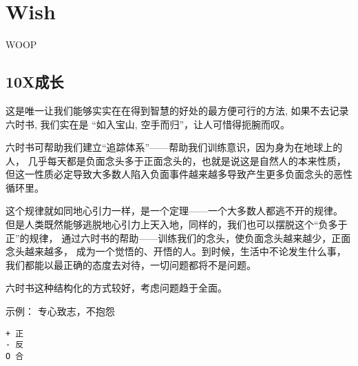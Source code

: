 \chapter{Wish}

WOOP

\section{10X成长}

\begin{tcolorbox}
这是唯一让我们能够实实在在得到智慧的好处的最方便可行的方法, 如果不去记录六时书, 
我们实在是 “如入宝山, 空手而归”，让人可惜得扼腕而叹。

六时书可帮助我们建立“追踪体系”——帮助我们训练意识，因为身为在地球上的人，
几乎每天都是负面念头多于正面念头的，也就是说这是自然人的本来性质，
但这一性质必定导致大多数人陷入负面事件越来越多导致产生更多负面念头的恶性循环里。

这个规律就如同地心引力一样，是一个定理——一个大多数人都逃不开的规律。
但是人类既然能够逃脱地心引力上天入地，同样的，我们也可以摆脱这个“负多于正”的规律，
通过六时书的帮助——训练我们的念头，使负面念头越来越少，正面念头越来越多，
成为一个觉悟的、开悟的人。到时候，生活中不论发生什么事，
我们都能以最正确的态度去对待，一切问题都将不是问题。
\end{tcolorbox}

六时书这种结构化的方式较好，考虑问题趋于全面。

示例： 专心致志，不抱怨

\begin{lstlisting}
+ 正
- 反
O 合
\end{lstlisting}
